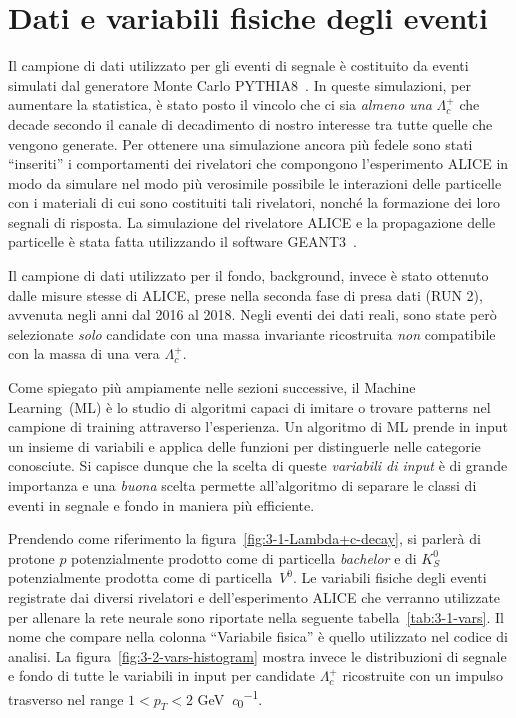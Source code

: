 \newpage

\section{Dati e variabili fisiche degli eventi}
    Il campione di dati utilizzato per gli eventi di segnale è costituito da eventi simulati dal generatore Monte Carlo PYTHIA8~\cite{PYTHIA8_2013_data_simul}. In queste simulazioni, per aumentare la statistica, è stato posto il vincolo che ci sia \textit{almeno una} $\Lambda_{c}^{+}$ che decade secondo il canale di decadimento di nostro interesse tra tutte quelle che vengono generate. Per ottenere una simulazione ancora più fedele sono stati ``inseriti'' i comportamenti dei rivelatori che compongono l’esperimento ALICE in modo da simulare nel modo più verosimile possibile le interazioni delle particelle con i materiali di cui sono costituiti tali rivelatori, nonché la formazione dei loro segnali di risposta. La simulazione del rivelatore ALICE e la propagazione delle particelle è stata fatta utilizzando il software GEANT3~\cite{GEANT3_1994}.

    Il campione di dati utilizzato per il fondo, background, invece è stato ottenuto dalle misure stesse di ALICE, prese nella seconda fase di presa dati (RUN 2), avvenuta negli anni dal 2016 al 2018. Negli eventi dei dati reali, sono state però selezionate \textit{solo} candidate con una massa invariante ricostruita \textit{non} compatibile con la massa di una vera $\Lambda_{c}^{+}$.
    
    Come spiegato più ampiamente nelle sezioni successive, il Machine Learning~(ML) è lo studio di algoritmi capaci di imitare o trovare patterns nel campione di training attraverso l’esperienza. Un algoritmo di ML prende in input un insieme di variabili e applica delle funzioni per distinguerle nelle categorie conosciute. Si capisce dunque che la scelta di queste \textit{variabili di input} è di grande importanza e una \textit{buona} scelta permette all’algoritmo di separare le classi di eventi in segnale e fondo in maniera più efficiente.
    
    Prendendo come riferimento la figura~\ref{fig:3-1-Lambda+c-decay}, si parlerà di protone $p$ potenzialmente prodotto come di particella \textit{bachelor} e di $K^{0}_{S}$ potenzialmente prodotta come di particella~$V^{0}$. Le variabili fisiche degli eventi registrate dai diversi rivelatori e dell’esperimento ALICE che verranno utilizzate per allenare la rete neurale sono riportate nella seguente tabella~\ref{tab:3-1-vars}. Il nome che compare nella colonna ``Variabile fisica'' è quello utilizzato nel codice di analisi. La figura~\ref{fig:3-2-vars-histogram} mostra invece le distribuzioni di segnale e fondo di tutte le variabili in input per candidate $\Lambda_{c}^{+}$ ricostruite con un impulso trasverso nel range $1 < p_{T} < 2$ \unit{\giga \eV \per \clight}.
    
